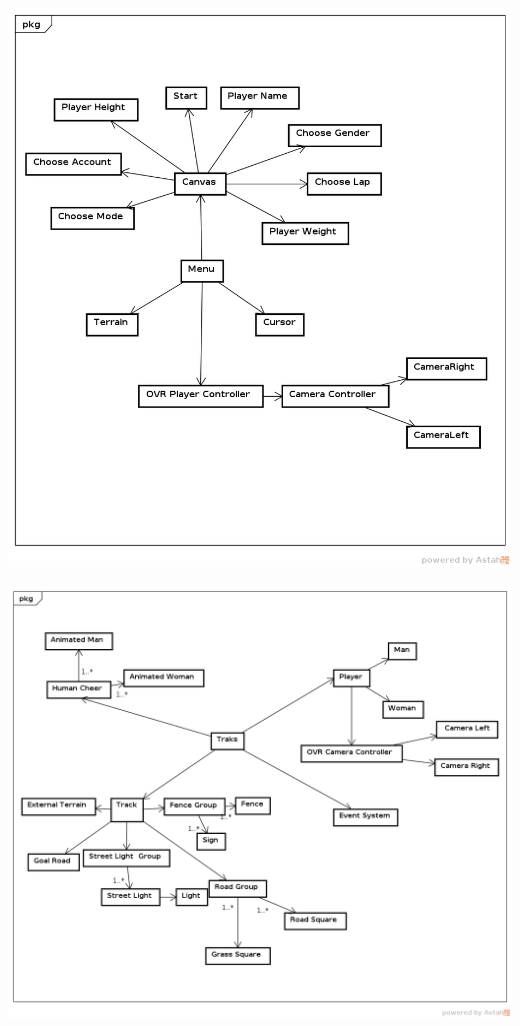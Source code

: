\begin{center}
	\includegraphics[scale=0.5]{figuras/menu_domain}
	\label{figura:menu_domain}
\end{center}

\begin{center}
	\includegraphics[scale=0.5]{figuras/main_domain}
	\label{figura:main_domain}
\end{center}

